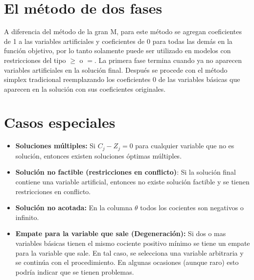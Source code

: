\section{El método de dos fases}
A diferencia del método de la gran M, para este método se agregan coeficientes de 1 a las variables artificiales y coeficientes de 0 para todas las demás en la función objetivo, por lo tanto solamente puede ser utilizado en modelos con restricciones del tipo $\geq$ o $=$. La primera fase termina cuando ya no aparecen variables artificiales en la solución final. Después se procede con el método simplex tradicional reemplazando los coeficientes 0 de las variables básicas que aparecen en la solución con sus coeficientes originales.

\section{Casos especiales}

\begin{itemize}
	\item \textbf{Soluciones múltiples:} Si $C_j - Z_j = 0$ para cualquier variable que no es solución, entonces existen soluciones óptimas múltiples.
	
	\item \textbf{Solución no factible (restricciones en conflicto)}: Si la solución final contiene una variable artificial, entonces no existe solución factible y se tienen restricciones en conflicto.
	
	\item \textbf{Solución no acotada:} En la columna $\theta$ todos los cocientes son negativos o infinito.
	
	\item \textbf{Empate para la variable que sale (Degeneración):}  Si dos o mas variables básicas tienen el mismo cociente positivo mínimo se tiene un empate para la variable que sale. En tal caso, se selecciona una variable arbitraria y se continúa con el procedimiento. En algunas ocasiones (aunque raro) esto podría indicar que se tienen problemas.
\end{itemize}

